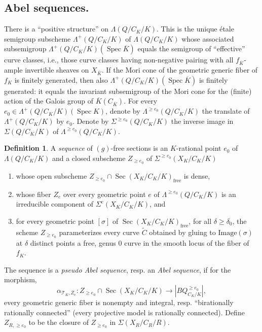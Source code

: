 \documentclass[11pt]{article}
\theoremstyle{definition}
\newtheorem{defi}[theo]{Definition}
\numberwithin{equation}{section}
\numberwithin{figure}{section}
\numberwithin{table}{section}
\newcommand{\mc}{\mathcal}
\newcommand{\mcT}{\mc{T}}
\newcommand{\wt}{\widetilde}
\newcommand{\ol}{\overline}
\newcommand{\Xx}{X}
\newcommand{\Cc}{C}
\newcommand{\Rr}{R}
\newcommand{\FR}{K}
\newcommand{\Lb}{\Lambda}
\DeclareMathOperator{\SP}{Spec}
\DeclareMathOperator{\Sec}{Sec}
\newcommand*{\romanenumi}{\renewcommand*{\theenumi}{\roman{enumi}}}
\begin{document}
\subsection{Abel sequences.} \label{subsec-Abelseq}
There is a ``positive structure'' on $\Lb(Q/\Cc_\FR/\FR)$. This is the unique étale semigroup subscheme $\Lb^+(Q/\Cc_\FR/\FR)$ of $\Lb(Q/\Cc_\FR/\FR)$ whose associated subsemigroup $\Lb^+(Q/\Cc_\FR/\FR)(\SP \ol{\FR})$ equals the semigroup of ``effective'' curve classes, i.e., those curve classes having non-negative pairing with all $f_{\ol{\FR}}$-ample invertible sheaves on $\Xx_{\ol{\FR}}$. If the Mori cone of the geometric generic fiber of $f_\FR$ is finitely generated, then also $\Lb^+(Q/\Cc_\FR/\FR)(\SP \ol{\FR})$ is finitely generated: it equals the invariant subsemigroup of the Mori cone for the (finite) action of the Galois group of $\ol{\FR}(\Cc_{\ol{\FR}})$. For every $e_0\in
\Lambda^+(Q/\Cc_\FR/\FR)(\SP \FR)$, denote by $\Lambda^{\geq e_0}(Q/\Cc_\FR/\FR)$ the translate of $\Lambda^+(Q/\Cc_\FR/\FR)$ by $e_0$. Denote by $\Sigma^{\geq e_0}(Q/\Cc_\FR/\FR)$ the inverse image in $\Sigma(Q/\Cc_\FR/\FR)$ of $\Lambda^{\geq e_0}(Q/\Cc_\FR/\FR)$.


\goodbreak
\begin{defi}\label{defn-seq}
A \emph{sequence} of $(g)$-free sections is an $\FR$-rational point $e_0$ of $\Lb(Q/\Cc_\FR/\FR)$ and a closed subscheme $Z_{\geq e_0}$ of $\Sigma^{\geq e_0}(\Xx_\FR/\Cc_\FR/\FR)$
\begin{enumerate}\romanenumi
\item \label{list2.5.1}whose open subscheme $Z_{\geq e_0}
\cap \Sec(\Xx_\FR/\Cc_\FR/\FR)_{\text{free}}$ is dense,
\item \label{list2.5.2}whose fiber $Z_e$ over every geometric point $e$ of $\Lb^{\geq e_0}(Q/\Cc_\FR/\FR)$ is an irreducible component of $\Sigma^e(\Xx_\FR/\Cc_\FR/\FR)$, and
\item \label{list2.5.3}for every geometric point $[\sigma]$ of $\Sec(\Xx_\FR/\Cc_\FR/\FR)_{\text{free}}$, for all $\delta \geq \delta_0$, the scheme $Z_{\geq e_0}$ parameterizes every curve $\wt{\Cc}$ obtained by gluing to $\text{Image}(\sigma)$ at $\delta$ distinct points a free, genus $0$ curve in the smooth locus of the fiber of $f_\FR$.
\end{enumerate}
The sequence is a \emph{pseudo Abel sequence}, resp. an \emph{Abel sequence}, if for the morphism,
\[
\alpha_{\mcT_\FR,Z_e}: Z_{\geq e_0}\cap\Sec(\Xx_\FR/\Cc_\FR/\FR) \to |BQ^{\geq e_0}_{\Cc_\FR/\FR}|,
\]
every geometric generic fiber is nonempty and integral, resp. ``birationally rationally connected'' (every projective model is rationally connected). Define $Z_{\Rr,\geq e_0}$ to be the closure of $Z_{\geq e_0}$ in $\Sigma(\Xx_\Rr/\Cc_\Rr/\Rr)$.
\end{defi}
\end{document}
